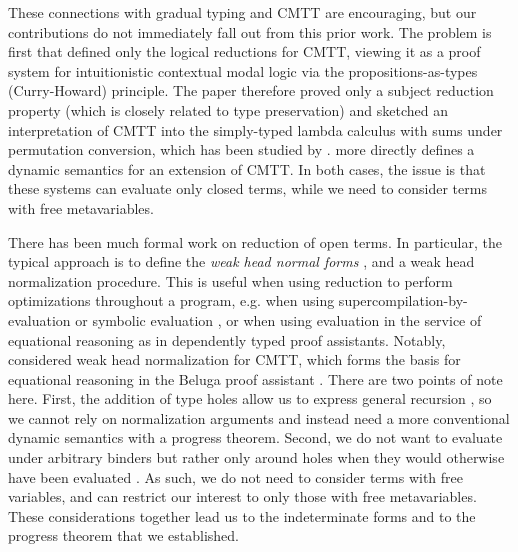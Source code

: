 %
These connections with gradual typing and CMTT are encouraging, but our contributions do not immediately fall out from this prior work.
%
The problem is first that \citet{Nanevski2008} defined only the logical reductions for CMTT, viewing it as a proof system for intuitionistic contextual modal logic via the propositions-as-types (Curry-Howard) principle. 
The paper therefore proved only a subject reduction property (which is closely related to type preservation) and sketched an interpretation of CMTT into the simply-typed lambda calculus with sums under permutation conversion, %
which has been studied by \citet{DBLP:journals/iandc/Groote02}. 
\citet{DBLP:conf/ppdp/PientkaD08} more directly defines a dynamic semantics for an extension of CMTT. In both cases, the issue is that these systems can evaluate only closed terms, while we need to consider terms with free metavariables. 

There has been much formal work on reduction of open terms. In particular, the typical approach is to define the \emph{weak head normal forms} \cite{barendregt84:_lambda_calculus,DBLP:journals/corr/abs-1009-2789,Abramsky:1990vv}, and a weak head normalization procedure. 
This is useful when using reduction to perform optimizations throughout a program, e.g. when using supercompilation-by-evaluation \cite{DBLP:conf/haskell/BolingbrokeJ10} or symbolic evaluation \cite{King:1976,SurveySymExec-CSUR18}, or when using evaluation in the service of equational reasoning as in dependently typed proof assistants. Notably, \citet{DBLP:journals/corr/abs-1009-2789} considered weak head normalization for CMTT, which forms the basis for equational reasoning in the Beluga proof assistant \cite{DBLP:conf/flops/Pientka10}. There are two points of note here. First, the addition of type holes allow us to express general recursion \cite{Siek06a}, so we cannot rely on normalization arguments and instead need a more conventional dynamic semantics with a progress theorem. Second, we do not want to evaluate under arbitrary binders but rather only around holes when they would otherwise have been evaluated \cite{DBLP:conf/birthday/BlancLM05}. As such, we do not need to consider terms with free variables, and can restrict our interest to only those with free metavariables. These considerations together lead us to the indeterminate forms and to the progress theorem that we established.

